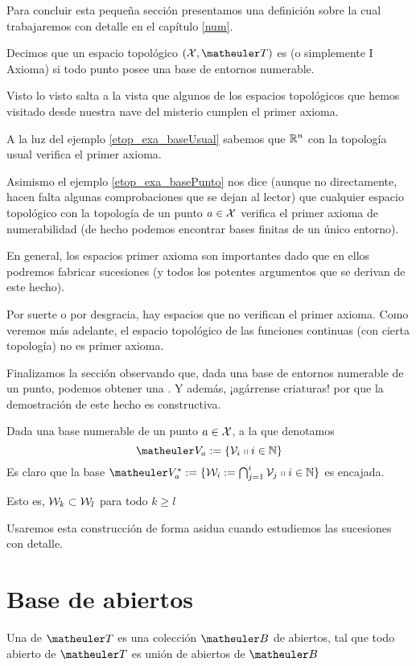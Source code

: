 Para concluir esta pequeña sección presentamos una definición sobre la cual trabajaremos con detalle en el capítulo \ref{num}.

\begin{defi}
	Decimos que un espacio topológico $(\X,\T)$ es  (o simplemente I Axioma) si todo punto posee una base de entornos numerable.
\end{defi}
Visto lo visto salta a la vista que algunos de los espacios topológicos que hemos visitado desde nuestra nave del misterio cumplen el primer axioma.
\begin{exa}
	A la luz del ejemplo \ref{etop_exa_baseUsual} sabemos que $\mathbb{R}^n$ con la topología usual verifica el primer axioma.
	
	Asimismo el ejemplo \ref{etop_exa_basePunto} nos dice (aunque no directamente, hacen falta algunas comprobaciones que se dejan al lector) que cualquier espacio topológico con la topología de un punto $a\in\mathcal{X}$ verifica el primer axioma de numerabilidad (de hecho podemos encontrar bases finitas de un único entorno).
\end{exa}
En general, los espacios primer axioma son importantes dado que en ellos podremos fabricar sucesiones (y todos los potentes argumentos que se derivan de este hecho).

Por suerte o por desgracia, hay espacios que no verifican el primer axioma. Como veremos más adelante, el espacio topológico de las funciones continuas (con cierta topología) no es primer axioma.

Finalizamos la sección observando que, dada una base de entornos numerable de un punto, podemos obtener una . Y además, ¡agárrense criaturas! por que la demostración de este hecho es constructiva.
\begin{obs}
	\label{etop_obs_base_encajada}
	Dada una base numerable de un punto $a\in\mathcal{X}$, a la que denotamos
	\begin{equation*}
		\Va{a}:=\{\V_i\tq i\in\N\}
	\end{equation*}
	Es claro que la base $\Va{a}^*:=\{\W_i:=\bigcap_{j=1}^i\V_j\tq i\in\N\}$ es encajada.
	
	Esto es, $\mathcal{W}_k\subset\mathcal{W}_l$ para todo $k\geq l$
\end{obs}
Usaremos esta construcción de forma asidua cuando estudiemos las sucesiones con detalle.
\section{Base de abiertos}
\begin{defi}
	\label{etop_bases_abiertos}
	Una  de $\T$ es una colección $\B$ de abiertos, tal que todo abierto de $\T$ es unión de abiertos de $\B$
\end{defi}

